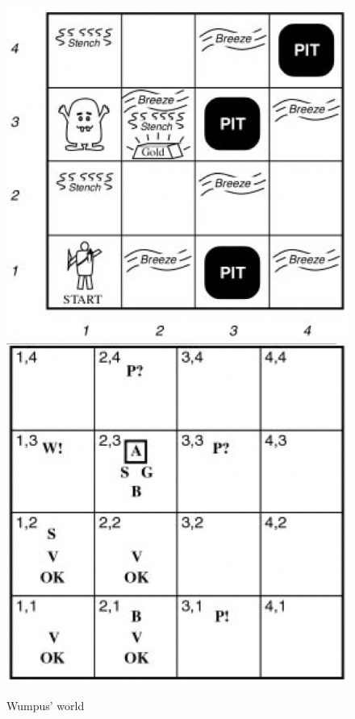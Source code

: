 \documentclass{article}
\begin{document}
\begin{figure}[H]
\centering
\includegraphics[scale=0.4]{Images/wumpus_a.png}
\includegraphics[scale=0.4]{Images/wumpus_b.png}
\caption{Wumpus' world}
\end{figure}
\end{document}
